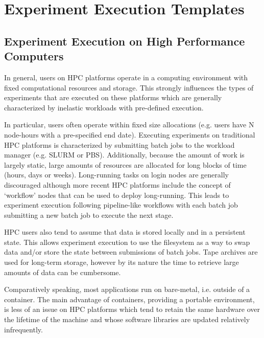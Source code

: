\documentclass[utf8]{FrontiersinVancouver} %
\begin{document}
\section{Experiment Execution Templates}

\subsection{Experiment Execution on High Performance Computers}
In general, users on HPC platforms operate in a computing environment with
fixed computational resources and storage. This strongly influences the types
of experiments that are executed on these platforms which are generally
characterized by inelastic workloads with pre-defined execution.

In particular, users often operate within fixed size allocations (e.g. users
have N node-hours with a pre-specified end date). Executing experiments on
traditional HPC platforms is characterized by submitting batch jobs to the
workload manager (e.g. SLURM or PBS). Additionally, because the amount of work
is largely static, large amounts of resources are allocated for long blocks of
time (hours, days or weeks). Long-running tasks on login nodes are generally
discouraged although more recent HPC platforms include the concept of `workflow'
nodes that can be used to deploy long-running. This leads to experiment
execution following pipeline-like workflows with each batch job submitting a new
batch job to execute the next stage.

HPC users also tend to assume that data is stored locally and in a persistent
state. This allows experiment execution to use the filesystem as a way to swap
data and/or store the state between submissions of batch jobs. Tape archives are
used for long-term storage, however by its nature the time to retrieve large
amounts of data can be cumbersome.

Comparatively speaking, most applications run on bare-metal, i.e. outside of a
container. The main advantage of containers, providing a portable environment,
is less of an issue on HPC platforms which tend to retain the same hardware over
the lifetime of the machine and whose software libraries are updated relatively
infrequently.

\end{document}
